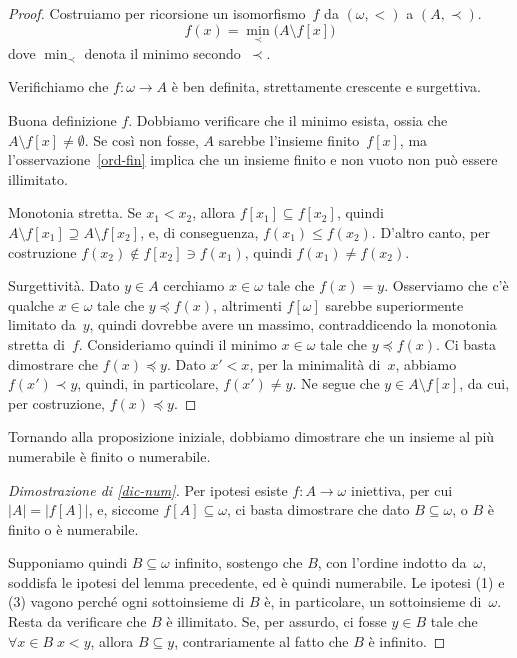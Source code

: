 \begin{proof}%
	Costruiamo per ricorsione un isomorfismo~$f$ da $(\omega, <)$ a
$(A,\prec)$.
	\[ f(x) = \operatorname{min}_\prec \big(A\setminus f[x]\big) \]
dove $\operatorname{min}_\prec$ denota il minimo secondo~$\prec$.

Verifichiamo che $f\colon \omega \to A$ \`e ben definita, strettamente crescente e surgettiva.

{\drkblu Buona definizione $f$.} Dobbiamo verificare che il minimo esista,
ossia che $A\setminus f[x]\neq\emptyset$. Se cos\`i non fosse, $A$ sarebbe
l'insieme finito~$f[x]$, ma l'osservazione~\ref{ord-fin} implica che un
insieme finito e non vuoto non pu\`o essere illimitato.

{\drkblu Monotonia stretta.} Se $x_1<x_2$, allora $f[x_1]\subseteq
f[x_2]$, quindi $A\setminus f[x_1] \supseteq A\setminus f[x_2]$, e, di
conseguenza, $f(x_1) \le f(x_2)$. D'altro canto, per costruzione $f(x_2)
\notin f[x_2] \ni f(x_1)$, quindi $f(x_1)\neq f(x_2)$.

{\drkblu Surgettivit\`a.} Dato $y \in A$ cerchiamo $x \in \omega$ tale che
$f(x) = y$. Osserviamo che c'\`e qualche $x\in\omega$ tale che $y \preceq f(x)$,
altrimenti $f[\omega]$ sarebbe superiormente
limitato da~$y$, quindi dovrebbe avere un massimo, contraddicendo la
monotonia stretta di~$f$. Consideriamo quindi il minimo $x\in\omega$ tale
che $y \preceq f(x)$. Ci basta dimostrare che $f(x)\preceq y$. Dato
$x'<x$, per la minimalit\`a di~$x$, abbiamo $f(x')\prec y$, quindi, in
particolare, $f(x')\neq y$. Ne segue che $y\in A\setminus f[x]$, da cui,
per costruzione, $f(x)\preceq y$.
\end{proof}

Tornando alla proposizione iniziale, dobbiamo dimostrare che un insieme
al pi\`u numerabile \`e finito o numerabile.

\begin{proof}[Dimostrazione di \ref{dic-num}]
	Per ipotesi esiste $f\colon A \rightarrow \omega$ iniettiva, per
cui $|A| = |f[A]|$, e, siccome $f[A] \subseteq \omega$,
	ci basta dimostrare che dato $B \subseteq \omega$, o $B$ \`e finito o \`e numerabile.

	Supponiamo quindi $B\subseteq\omega$  infinito, sostengo che $B$,
con l'ordine indotto da~$\omega$,
soddisfa le ipotesi del lemma precedente, ed \`e quindi numerabile. Le
ipotesi (1) e (3) vagono perch\'e ogni sottoinsieme di $B$ \`e, in
particolare, un sottoinsieme di~$\omega$. Resta da verificare che $B$ \`e
illimitato. 
Se, per assurdo, ci fosse $y\in B$ tale che $\forall x\in B\;x<y$, allora
$B \subseteq y$, contrariamente al fatto che $B$ \`e infinito.
\end{proof}

